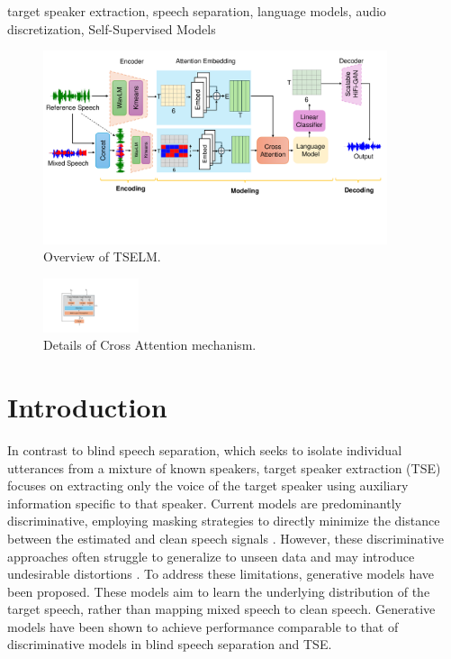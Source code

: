 \documentclass[conference]{IEEEtran}
\begin{document}
\begin{IEEEkeywords}
target speaker extraction, speech separation, language models, audio discretization, Self-Supervised Models
\end{IEEEkeywords}
\begin{figure}[t]
    \centering
    \includegraphics[width=0.9\textwidth]{assets/model.pdf}
    \caption{Overview of TSELM.}
    \label{model}
    \end{figure}

    \begin{figure}
        \centering
        \includegraphics[width=0.25\textwidth]{assets/cross_attention.pdf}
        \caption{Details of Cross Attention mechanism.}
        \label{cross_attention}
        \end{figure}


        
\section{Introduction}

In contrast to blind speech separation, which seeks to isolate individual utterances from a mixture of known speakers, target speaker extraction (TSE) focuses on extracting only the voice of the target speaker using auxiliary information specific to that speaker. Current models are predominantly discriminative, employing masking strategies to directly minimize the distance between the estimated and clean speech signals \cite{luo2019conv,spex_plus,sepformer,sef_net}. However, these discriminative approaches often struggle to generalize to unseen data and may introduce undesirable distortions \cite{distortion}. To address these limitations, generative models have been proposed. These models aim to learn the underlying distribution of the target speech, rather than mapping mixed speech to clean speech. Generative models have been shown to achieve performance comparable to that of discriminative models \cite{target_diff,tokensplit} in blind speech separation and TSE.
\end{document}
